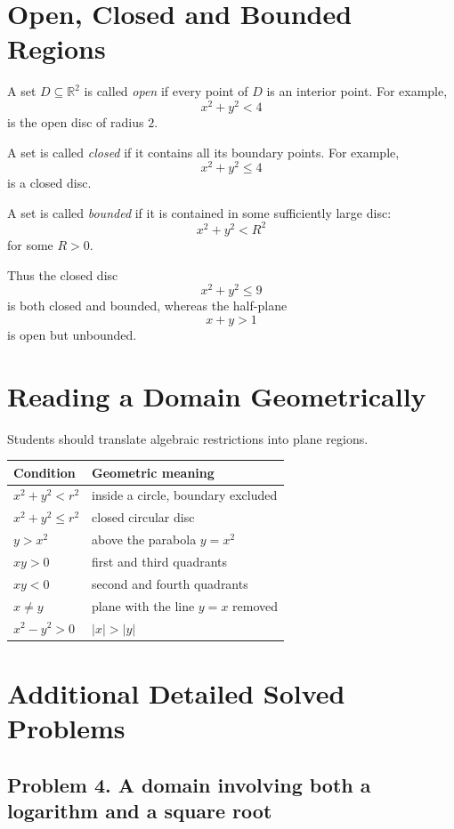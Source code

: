 \documentclass[11pt,oneside]{book}
\theoremstyle{studentthm}
\theoremstyle{definition}
\newcommand{\R}{\mathbb{R}}
\begin{document}
\section{Open, Closed and Bounded Regions}

A set \(D\subseteq\R^2\) is called \emph{open} if every point of \(D\) is
an interior point. For example,
\[
x^2+y^2<4
\]
is the open disc of radius \(2\).

A set is called \emph{closed} if it contains all its boundary points.
For example,
\[
x^2+y^2\le4
\]
is a closed disc.

A set is called \emph{bounded} if it is contained in some sufficiently
large disc:
\[
x^2+y^2<R^2
\]
for some \(R>0\).

Thus the closed disc
\[
x^2+y^2\le9
\]
is both closed and bounded, whereas the half-plane
\[
x+y>1
\]
is open but unbounded.

\section{Reading a Domain Geometrically}

Students should translate algebraic restrictions into plane regions.

\begin{center}
\begin{tabular}{ll}
Condition & Geometric meaning\\
\toprule
\(x^2+y^2<r^2\) & inside a circle, boundary excluded\\
\(x^2+y^2\le r^2\) & closed circular disc\\
\(y>x^2\) & above the parabola \(y=x^2\)\\
\(xy>0\) & first and third quadrants\\
\(xy<0\) & second and fourth quadrants\\
\(x\ne y\) & plane with the line \(y=x\) removed\\
\(x^2-y^2>0\) & \(|x|>|y|\)\\
\end{tabular}
\end{center}

\section{Additional Detailed Solved Problems}

\subsection*{Problem 4. A domain involving both a logarithm and a square root}
\end{document}

